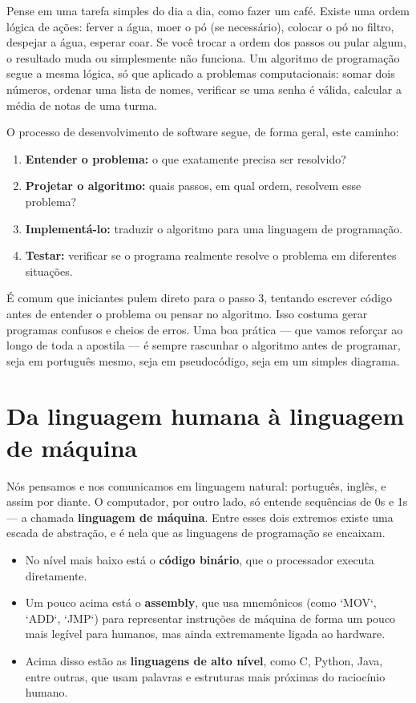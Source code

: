 \documentclass[12pt,a4paper,oneside]{extreport}
\begin{document}
Pense em uma tarefa simples do dia a dia, como fazer um café. Existe uma ordem lógica de ações: ferver a água, moer o pó (se necessário), colocar o pó no filtro, despejar a água, esperar coar. Se você trocar a ordem dos passos ou pular algum, o resultado muda ou simplesmente não funciona. Um algoritmo de programação segue a mesma lógica, só que aplicado a problemas computacionais: somar dois números, ordenar uma lista de nomes, verificar se uma senha é válida, calcular a média de notas de uma turma.

O processo de desenvolvimento de software segue, de forma geral, este caminho:


\begin{enumerate}

\item \textbf{Entender o problema:} o que exatamente precisa ser resolvido?
\item \textbf{Projetar o algoritmo:} quais passos, em qual ordem, resolvem esse problema?
\item \textbf{Implementá-lo:} traduzir o algoritmo para uma linguagem de programação.
\item \textbf{Testar:} verificar se o programa realmente resolve o problema em diferentes situações.

\end{enumerate}


É comum que iniciantes pulem direto para o passo 3, tentando escrever código antes de entender o problema ou pensar no algoritmo. Isso costuma gerar programas confusos e cheios de erros. Uma boa prática — que vamos reforçar ao longo de toda a apostila — é sempre rascunhar o algoritmo antes de programar, seja em português mesmo, seja em pseudocódigo, seja em um simples diagrama.


\section{Da linguagem humana à linguagem de máquina}

Nós pensamos e nos comunicamos em linguagem natural: português, inglês, e assim por diante. O computador, por outro lado, só entende sequências de 0s e 1s — a chamada \textbf{linguagem de máquina}. Entre esses dois extremos existe uma escada de abstração, e é nela que as linguagens de programação se encaixam.

\begin{itemize}

    \item No nível mais baixo está o \textbf{código binário}, que o processador executa diretamente.
    \item Um pouco acima está o \textbf{assembly}, que usa mnemônicos (como `MOV`, `ADD`, `JMP`) para representar instruções de máquina de forma um pouco mais legível para humanos, mas ainda extremamente ligada ao hardware.
    \item Acima disso estão as \textbf{linguagens de alto nível}, como C, Python, Java, entre outras, que usam palavras e estruturas mais próximas do raciocínio humano.
    
\end{itemize}
\end{document}
